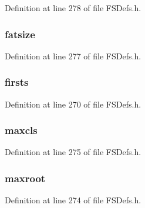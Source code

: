 Definition at line 278 of file F\+S\+Defs.\+h.

\hypertarget{struct_d_i_s_k_a11e569ece9ab2d324e773426da5c0bfe}{}
\subsubsection[{fatsize}]{ fatsize}\label{struct_d_i_s_k_a11e569ece9ab2d324e773426da5c0bfe}


Definition at line 277 of file F\+S\+Defs.\+h.

\hypertarget{struct_d_i_s_k_a06ecec885cf3c8cfdcf1125d17958432}{}
\subsubsection[{firsts}]{ firsts}\label{struct_d_i_s_k_a06ecec885cf3c8cfdcf1125d17958432}


Definition at line 270 of file F\+S\+Defs.\+h.

\hypertarget{struct_d_i_s_k_a333cc1dd1174def8af56d4c03e97d537}{}
\subsubsection[{maxcls}]{ maxcls}\label{struct_d_i_s_k_a333cc1dd1174def8af56d4c03e97d537}


Definition at line 275 of file F\+S\+Defs.\+h.

\hypertarget{struct_d_i_s_k_a253064a74611d30875379e54f97c1950}{}
\subsubsection[{maxroot}]{ maxroot}\label{struct_d_i_s_k_a253064a74611d30875379e54f97c1950}


Definition at line 274 of file F\+S\+Defs.\+h.

\hypertarget{struct_d_i_s_k_aaff6041e51154e6e228bbaba9d97a296}{}
